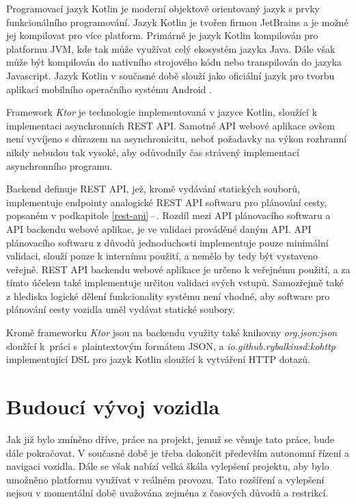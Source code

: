 \documentclass[czech, bachelor]{diploma}
\newcommand{\filipref}[1]{\ref{#1}\,--\,\nameref{#1}}
\begin{document}
Programovací jazyk Kotlin je moderní objektově orientovaný jazyk s prvky funkcionálního programování. Jazyk Kotlin je tvořen
firmou JetBrains a je možné jej kompilovat pro více platform. Primárně je jazyk Kotlin kompilován pro platformu JVM, kde tak může
využívat celý ekosystém jazyka Java. Dále však může být kompilován do nativního strojového kódu nebo transpilován do jazyka
Javascript. Jazyk Kotlin v současné době slouží jako oficiální jazyk pro tvorbu aplikací mobilního operačního systému Android
\cite{kotlin-android-source}.

Framework \emph{Ktor} je technologie implementovaná v jazyce Kotlin, sloužící k implementaci asynchronních REST API. Samotné API
webové aplikace ovšem není vyvíjeno s důrazem na asynchronicitu, neboť požadavky na výkon rozhranní nikdy nebudou tak vysoké, aby
odůvodnily čas strávený implementací asynchronního programu.

Backend definuje REST API, jež, kromě vydávání statických souborů, implementuje endpointy analogické REST API softwaru
pro plánování cesty, popsaném v podkapitole \filipref{rest-api}. Rozdíl mezi API plánovacího softwaru a API backendu webové
aplikac, je ve validaci prováděné daným API. API plánovacího softwaru z důvodů jednoduchosti implementuje pouze minimální
validaci, slouží pouze k internímu použití, a nemělo by tedy být vystaveno veřejně. REST API backendu webové aplikace je určeno
k veřejnému použití, a za tímto účelem také implementuje určitou validaci svých vstupů. Samozřejmě také z hlediska logické dělení
funkcionality systému není vhodné, aby software pro plánování cesty vozidla uměl vydávat statické soubory.

Kromě frameworku \emph{Ktor} jsou na backendu využity také knihovny \emph{org.json:json} sloužící k~práci s~plaintextovým formátem
JSON, a \emph{io.github.rybalkinsd:kohttp} implementující DSL pro jazyk Kotlin sloužící k vytváření HTTP dotazů.

\chapter{Budoucí vývoj vozidla}

Jak již bylo zmíněno dříve, práce na projekt, jemuž se věnuje tato práce, bude dále pokračovat. V současné době je třeba dokončit
především autonomní řízení a navigaci vozidla. Dále se však nabízí velká škála vylepšení projektu, aby bylo umožněno platformu
využívat v reálném provozu. Tato rozšíření a vylepšení nejsou v momentální době uvažována zejména z časových důvodů a restrikcí.
\end{document}
